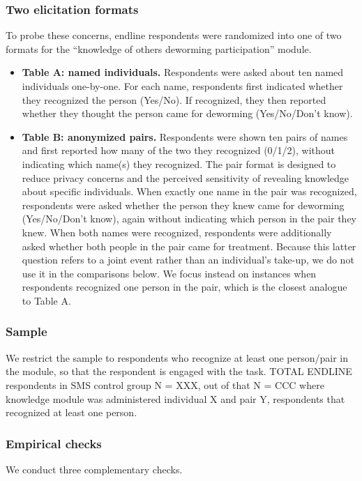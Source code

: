 \documentclass[12pt,a4paper]{article}
\begin{document}
\subsubsection*{Two elicitation formats}
To probe these concerns, endline respondents were randomized into one of two formats for the ``knowledge of others deworming participation'' module.%

\begin{itemize}
  \item \textbf{Table A: named individuals.} Respondents were asked about ten named individuals one-by-one. For each name, respondents first indicated whether they recognized the person (Yes/No). If recognized, they then reported whether they thought the person came for deworming (Yes/No/Don't know).
  \item \textbf{Table B: anonymized pairs.} Respondents were shown ten pairs of names and first reported how many of the two they recognized (0/1/2), without indicating which name(s) they recognized. The pair format is designed to reduce privacy concerns and the perceived sensitivity of revealing knowledge about specific individuals. When exactly one name in the pair was recognized, respondents were asked whether the person they knew came for deworming (Yes/No/Don't know), again without indicating which person in the pair they knew. When both names were recognized, respondents were additionally asked whether both people in the pair came for treatment. Because this latter question refers to a joint event rather than an individual's take-up, we do not use it in the comparisons below. We focus instead on instances when respondents recognized one person in the pair, which is the closest analogue to Table A. 
\end{itemize}


\subsubsection*{Sample} We restrict the sample to respondents who recognize at least one person/pair in the module, so that the respondent is engaged with the task. TOTAL ENDLINE respondents in SMS control group N = XXX, out of that N = CCC where knowledge module was administered individual X and pair Y, respondents that recognized at least one person. 


\subsubsection*{Empirical checks}
We conduct three complementary checks.
\end{document}
